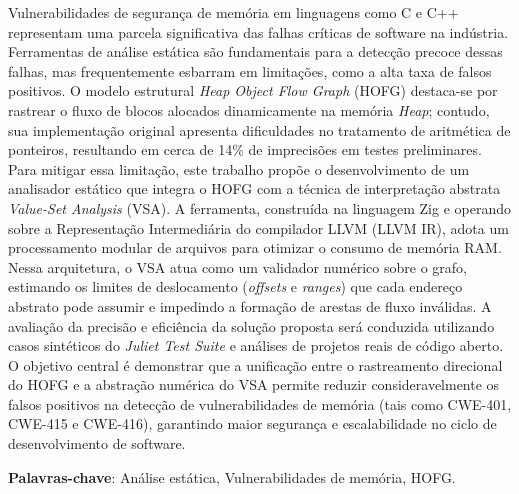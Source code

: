 \documentclass[
    12pt,                %
    openright,           %
    oneside,             %
    a4paper,             %
    english,             %
    brazil               %
]{abntex2}
\begin{document}

\frenchspacing

\pretextual

\imprimircapa

\imprimirfolhaderosto

\begin{resumo}

\vspace{\onelineskip}

Vulnerabilidades de segurança de memória em linguagens como C e C++ representam uma parcela significativa das falhas críticas de software na indústria. 
Ferramentas de análise estática são fundamentais para a detecção precoce dessas falhas, mas frequentemente esbarram em limitações, como a alta taxa de falsos positivos. 
O modelo estrutural \textit{Heap Object Flow Graph} (HOFG) destaca-se por rastrear o fluxo de blocos alocados dinamicamente na memória \textit{Heap}; contudo, sua implementação original apresenta dificuldades no tratamento de aritmética de ponteiros, 
resultando em cerca de 14\% de imprecisões em testes preliminares. Para mitigar essa limitação, este trabalho propõe o desenvolvimento de um analisador estático que integra o HOFG com a técnica de interpretação abstrata \textit{Value-Set Analysis} (VSA). 
A ferramenta, construída na linguagem Zig e operando sobre a Representação Intermediária do compilador LLVM (LLVM IR), adota um processamento modular de arquivos para otimizar o consumo de memória RAM. Nessa arquitetura, o VSA atua como um validador numérico sobre o grafo, estimando os limites de deslocamento (\textit{offsets} e \textit{ranges}) 
que cada endereço abstrato pode assumir e impedindo a formação de arestas de fluxo inválidas. A avaliação da precisão e eficiência da solução proposta será conduzida utilizando casos sintéticos do \textit{Juliet Test Suite} e análises de projetos reais de código aberto. O objetivo central é demonstrar que a unificação entre o rastreamento direcional do HOFG e a 
abstração numérica do VSA permite reduzir consideravelmente os falsos positivos na detecção de vulnerabilidades de memória (tais como CWE-401, CWE-415 e CWE-416), garantindo maior segurança e escalabilidade no ciclo de desenvolvimento de software.

\vspace{\onelineskip}

\noindent
\textbf{Palavras-chave}: Análise estática, Vulnerabilidades de memória, HOFG.
\end{resumo}
\end{document}
